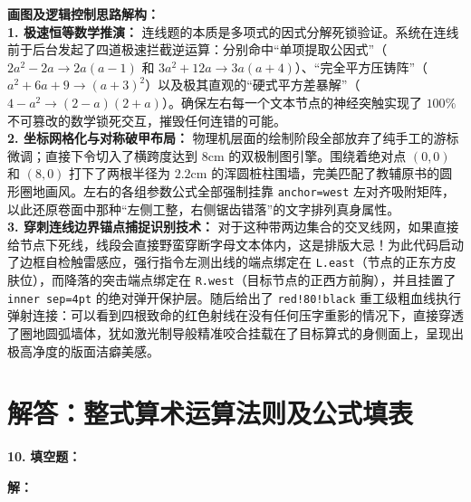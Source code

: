 \documentclass[12pt, a4paper]{ctexrep}
\begin{document}
\vspace{0.4cm}
{\small\color{blue!70!black}
\textbf{画图及逻辑控制思路解构：}\\
\textbf{1. 极速恒等数学推演：} 连线题的本质是多项式的因式分解死锁验证。系统在连线前于后台发起了四道极速拦截逆运算：分别命中“单项提取公因式”（$2a^2 - 2a \rightarrow 2a(a - 1)$ 和 $3a^2 + 12a \rightarrow 3a(a + 4)$）、“完全平方压铸阵”（$a^2 + 6a + 9 \rightarrow (a+3)^2$）以及极其直观的“硬式平方差暴解”（$4 - a^2 \rightarrow (2-a)(2+a)$）。确保左右每一个文本节点的神经突触实现了 $100\%$ 不可篡改的数学锁死交互，摧毁任何连错的可能。\\
\textbf{2. 坐标网格化与对称破甲布局：} 物理机层面的绘制阶段全部放弃了纯手工的游标微调；直接下令切入了横跨度达到 $8\mathrm{cm}$ 的双极制图引擎。围绕着绝对点 $(0,0)$ 和 $(8,0)$ 打下了两根半径为 $2.2\mathrm{cm}$ 的浑圆桩柱围墙，完美匹配了教辅原书的圆形圈地画风。左右的各组参数公式全部强制挂靠 \texttt{anchor=west} 左对齐吸附矩阵，以此还原卷面中那种“左侧工整，右侧锯齿错落”的文字排列真身属性。\\
\textbf{3. 穿刺连线边界锚点捕捉识别技术：} 对于这种带两边集合的交叉线网，如果直接给节点下死线，线段会直接野蛮穿断字母文本体内，这是排版大忌！为此代码启动了边框自检触雷感应，强行指令左测出线的端点绑定在 \texttt{L.east}（节点的正东方皮肤位），而降落的突击端点绑定在 \texttt{R.west}（目标节点的正西方前胸），并且挂置了 \texttt{inner sep=4pt} 的绝对弹开保护层。随后给出了 \texttt{red!80!black} 重工级粗血线执行弹射连接：可以看到四根致命的红色射线在没有任何压字重影的情况下，直接穿透了圈地圆弧墙体，犹如激光制导般精准咬合挂载在了目标算式的身侧面上，呈现出极高净度的版面洁癖美感。
}
\newpage

\section{解答：整式算术运算法则及公式填表}

\vspace{0.6cm}

\textbf{\LARGE 10.} \textbf{填空题：}

\vspace{0.4cm}
\textbf{解：}
\end{document}
